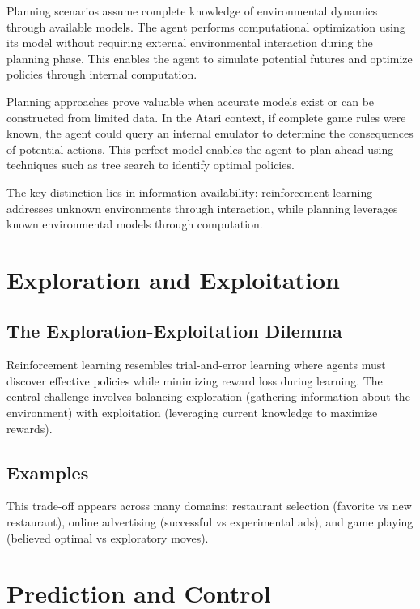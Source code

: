     Planning scenarios assume complete knowledge of environmental dynamics through available models. The agent performs computational optimization using its model without requiring external environmental interaction during the planning phase. This enables the agent to simulate potential futures and optimize policies through internal computation.
    
    Planning approaches prove valuable when accurate models exist or can be constructed from limited data. In the Atari context, if complete game rules were known, the agent could query an internal emulator to determine the consequences of potential actions. This perfect model enables the agent to plan ahead using techniques such as tree search to identify optimal policies.
    
    The key distinction lies in information availability: reinforcement learning addresses unknown environments through interaction, while planning leverages known environmental models through computation.


\section{Exploration and Exploitation}

\subsection{The Exploration-Exploitation Dilemma}

    Reinforcement learning resembles trial-and-error learning where agents must discover effective policies while minimizing reward loss during learning. The central challenge involves balancing exploration (gathering information about the environment) with exploitation (leveraging current knowledge to maximize rewards).


\subsection{Examples}

    This trade-off appears across many domains: restaurant selection (favorite vs new restaurant), online advertising (successful vs experimental ads), and game playing (believed optimal vs exploratory moves).


\section{Prediction and Control}


